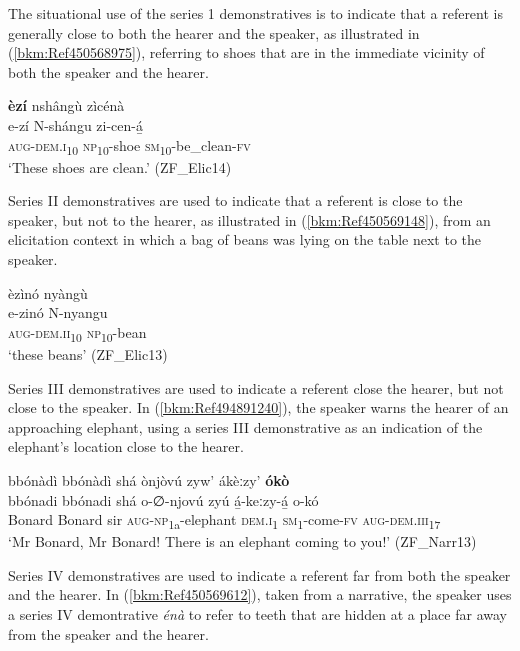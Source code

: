 The situational use of the series 1 demonstratives is to indicate that a referent is generally close to both the hearer and the speaker, as illustrated in (\ref{bkm:Ref450568975}), referring to shoes that are in the immediate vicinity of both the speaker and the hearer.

\ea
\label{bkm:Ref450568975}
\textbf{èzí} nshângù zìcénà\\
\gll e-zí    N-shángu  zi-cen-á̲\\
\textsc{aug}-\textsc{dem}.\textsc{i}\textsubscript{10}  \textsc{np}\textsubscript{10}-shoe  \textsc{sm}\textsubscript{10}-be\_clean-\textsc{fv}\\
\glt ‘These shoes are clean.’ (ZF\_Elic14)
\z

Series II demonstratives are used to indicate that a referent is close to the speaker, but not to the hearer, as illustrated in (\ref{bkm:Ref450569148}), from an elicitation context in which a bag of beans was lying on the table next to the speaker.

\ea
\label{bkm:Ref450569148}
èzìnó nyàngù\\
\gll e-zinó    N-nyangu\\
\textsc{aug}-\textsc{dem}.\textsc{ii}\textsubscript{10}  \textsc{np}\textsubscript{10}-bean\\
\glt ‘these beans’ (ZF\_Elic13)
\z

Series III demonstratives are used to indicate a referent close the hearer, but not close to the speaker. In (\ref{bkm:Ref494891240}), the speaker warns the hearer of an approaching elephant, using a series III demonstrative as an indication of the elephant’s location close to the hearer.

\ea
\label{bkm:Ref494891240}
bbónàdì bbónàdì shá ònjòvú zyw’ ákèːzy’ \textbf{ókò}\\
\gll bbónadi   bbónadi  shá o-∅-njovú    zyú  á̲-keːzy-á̲  o-kó \\
Bonard  Bonard  sir \textsc{aug}-\textsc{np}\textsubscript{1a}-elephant  \textsc{dem}.\textsc{i}\textsubscript{1}  \textsc{sm}\textsubscript{1}-come-\textsc{fv} \textsc{aug}-\textsc{dem}.\textsc{iii}\textsubscript{17}\\
\glt ‘Mr Bonard, Mr Bonard! There is an elephant coming to you!’ (ZF\_Narr13)
\z

Series IV demonstratives are used to indicate a referent far from both the speaker and the hearer. In (\ref{bkm:Ref450569612}), taken from a narrative, the speaker uses a series IV demontrative \textit{énà} to refer to teeth that are hidden at a place far away from the speaker and the hearer.

